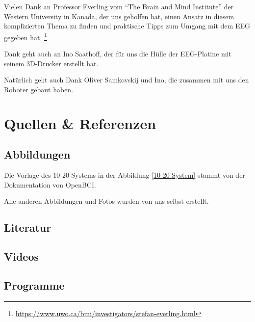 \documentclass[11pt]{scrartcl}
\begin{document}
	Vielen Dank an Professor Everling vom \enquote{The Brain and Mind Institute} der Western University in Kanada, der uns geholfen hat, einen Ansatz in diesem komplizierten Thema zu finden und praktische Tipps zum Umgang mit dem EEG gegeben hat. \footnote{\href{https://www.uwo.ca/bmi/investigators/stefan-everling.html}{https://www.uwo.ca/bmi/investigators/stefan-everling.html}}

	Dank geht auch an Ino Saathoff, der für uns die Hülle der EEG-Platine mit seinem 3D-Drucker erstellt hat.

	Natürlich geht auch Dank Oliver Samkovskij und Ino, die zusammen mit uns den Roboter gebaut haben.

	\section{Quellen \& Referenzen}

	\subsection{Abbildungen}

	Die Vorlage des 10-20-Systems in der Abbildung \ref{10-20-System} stammt von der Dokumentation von OpenBCI. \cite{OpenBCI}
	
	Alle anderen Abbildungen und Fotos wurden von uns selbst erstellt.

	\subsection{Literatur}
	\printbibliography[heading=none, keyword={Literatur}, notkeyword={YTVideos}]

	\subsection{Videos}
	\printbibliography[heading=none, keyword={YTVideos}]

	\subsection{Programme}
	\printbibliography[heading=none, keyword=Programme]
\end{document}
